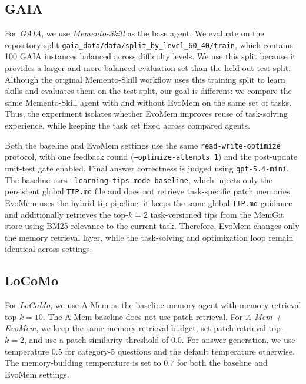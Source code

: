\documentclass{llmxive}
\begin{document}
\subsection{GAIA}
\label{app:setting_gaia}

For \emph{GAIA}, we use \emph{Memento-Skill} \cite{memento-s} as the base agent. We evaluate on the repository split \texttt{gaia\_data/data/split\_by\_level\_60\_40/train}, which contains 100 GAIA instances balanced across difficulty levels. We use this split because it provides a larger and more balanced evaluation set than the held-out test split. Although the original Memento-Skill workflow uses this training split to learn skills and evaluates them on the test split, our goal is different: we compare the same Memento-Skill agent with and without EvoMem on the same set of tasks. Thus, the experiment isolates whether EvoMem improves reuse of task-solving experience, while keeping the task set fixed across compared agents.

Both the baseline and EvoMem settings use the same \texttt{read-write-optimize} protocol, with one feedback round (\texttt{--optimize-attempts 1}) and the post-update unit-test gate enabled. Final answer correctness is judged using \texttt{gpt-5.4-mini}. The baseline uses \texttt{--learning-tips-mode baseline}, which injects only the persistent global \texttt{TIP.md} file and does not retrieve task-specific patch memories. EvoMem uses the hybrid tip pipeline: it keeps the same global \texttt{TIP.md} guidance and additionally retrieves the top-$k=2$ task-versioned tips from the MemGit store using BM25 relevance to the current task. Therefore, EvoMem changes only the memory retrieval layer, while the task-solving and optimization loop remain identical across settings.

\subsection{LoCoMo}
\label{app:setting_locomo}
For \emph{LoCoMo}, we use A-Mem as the baseline memory agent with memory retrieval top-$k=10$. The A-Mem baseline does not use patch retrieval. For \emph{A-Mem + EvoMem}, we keep the same memory retrieval budget, set patch retrieval top-$k=2$, and use a patch similarity threshold of $0.0$. For answer generation, we use temperature $0.5$ for category-5 questions and the default temperature otherwise. The memory-building temperature is set to $0.7$ for both the baseline and EvoMem settings.
\end{document}
